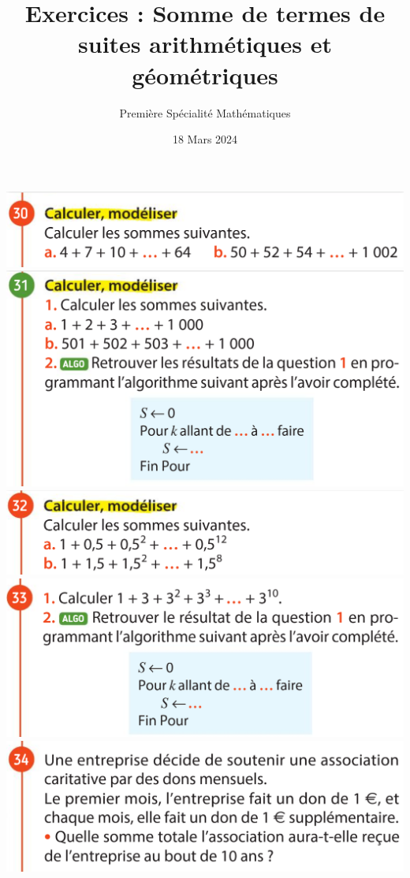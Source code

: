 \documentclass{article}
\title{Exercices : Somme de termes de suites arithmétiques et géométriques}
\author{Première Spécialité Mathématiques}
\date{18 Mars 2024}
\begin{document}
\maketitle

\begin{center}
\includegraphics[width=\textwidth]{Exercice_1.png}
\includegraphics[width=\textwidth]{Exercice_2.png}
\includegraphics[width=\textwidth]{Exercice_3.png}
\includegraphics[width=\textwidth]{Exercice_4.png}
\includegraphics[width=\textwidth]{Exercice_5.png}

\end{center}
\end{document}
